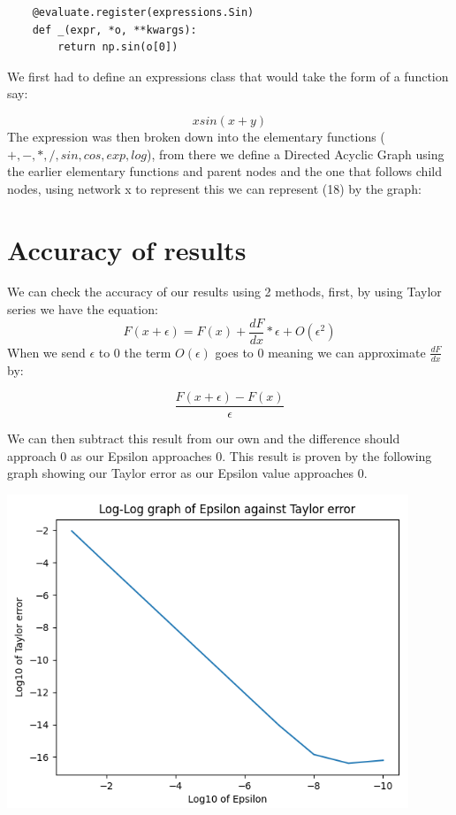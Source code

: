 \documentclass{article}
\begin{document}
\begin{verbatim}
    @evaluate.register(expressions.Sin)
    def _(expr, *o, **kwargs):
        return np.sin(o[0])
\end{verbatim}


We first had to define an expressions class that would take the form of a function say:



\begin{equation}
xsin(x+y)
\end{equation}
The expression was then broken down into the elementary functions ($+, -, *, /, sin, cos, exp, log$), from there we define a Directed Acyclic Graph using the earlier elementary functions and parent nodes and the one that follows child nodes, using network x to represent this we can represent (18) by the graph:

\section{Accuracy of results}

We can check the accuracy of our results using 2 methods, first, by using Taylor series we have the equation:
\begin{equation}
    F(x + \epsilon) = F(x) + \frac{dF}{dx} * \epsilon + O(\epsilon ^ 2)
\end{equation}
When we send $\epsilon$ to 0 the term $O(\epsilon)$ goes to 0 meaning we can approximate $\frac{dF}{dx}$ by:

\begin{equation}
    \frac{F(x + \epsilon) - F(x)}{\epsilon}
\end{equation}

We can then subtract this result from our own and the difference should approach 0 as our Epsilon approaches 0. This result is proven by the following graph showing our Taylor error as our Epsilon value approaches 0.

\begin{center}
    \includegraphics[width=12cm]{images/Taylor_error_1.png}
\end{center}
\end{document}
